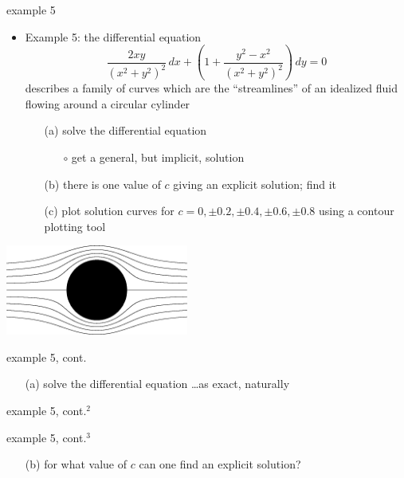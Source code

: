 \documentclass{beamer}
\begin{document}
\begin{frame}{example 5}

\begin{itemize}
\item Example 5:  the differential equation
    $$\frac{2xy}{(x^2+y^2)^2}\,dx + \left(1 + \frac{y^2-x^2}{(x^2+y^2)^2}\right)\,dy = 0$$
describes a family of curves which are the ``streamlines'' of an idealized fluid flowing around a circular cylinder

    \begin{itemize}
    \item[(a)] solve the differential equation
        \begin{itemize}
        \item[$\circ$] get a general, but implicit, solution
        \end{itemize}
    \item[(b)] there is one value of $c$ giving an explicit solution; find it
    \item[(c)] plot solution curves for $c=0,\pm 0.2, \pm 0.4, \pm 0.6, \pm 0.8$ using a contour plotting tool
    \end{itemize}
\end{itemize}

\vspace{-2mm}
\hfill \includegraphics[width=0.45\textwidth]{figs/streamcyl-clean}
\end{frame}


\begin{frame}{example 5, cont.}

\begin{itemize}
\item[(a)] solve the differential equation \dots as exact, naturally
\end{itemize}

\vspace{65mm}
\end{frame}


\begin{frame}{example 5, cont.$^2$}
\end{frame}


\begin{frame}{example 5, cont.$^3$}

\begin{itemize}
\item[(b)] for what value of $c$ can one find an explicit solution?
\end{itemize}

\vspace{60mm}
\end{frame}
\end{document}
